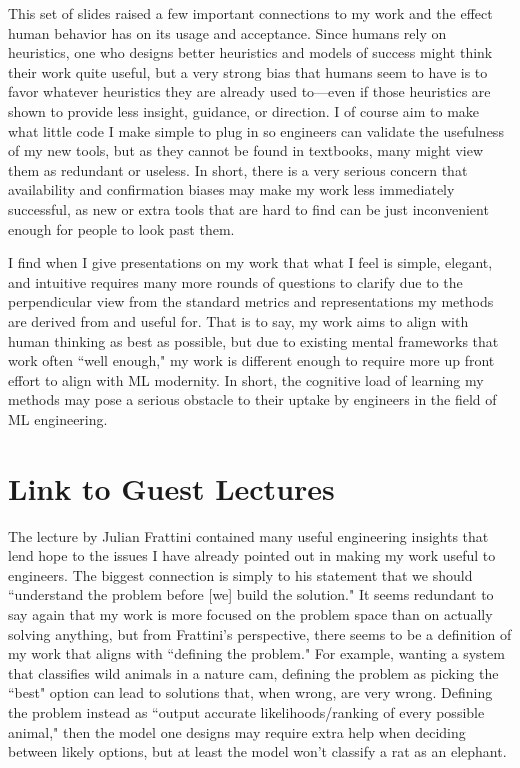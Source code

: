 \documentclass{article}
\begin{document}
This set of slides raised a few important connections to my work and the effect human behavior has on its usage and acceptance. 
Since humans rely on heuristics, one who designs better heuristics and models of success might think their work quite useful, but a very strong bias that humans seem to have is to favor whatever heuristics they are already used to—even if those heuristics are shown to provide less insight, guidance, or direction. 
I of course aim to make what little code I make simple to plug in so engineers can validate the usefulness of my new tools, but as they cannot be found in textbooks, many might view them as redundant or useless.
In short, there is a very serious concern that availability and confirmation biases may make my work less immediately successful, as new or extra tools that are hard to find can be just inconvenient enough for people to look past them. 

I find when I give presentations on my work that what I feel is simple, elegant, and intuitive requires many more rounds of questions to clarify due to the perpendicular view from the standard metrics and representations my methods are derived from and useful for. 
That is to say, my work aims to align with human thinking as best as possible, but due to existing mental frameworks that work often ``well enough," my work is different enough to require more up front effort to align with ML modernity. 
In short, the cognitive load of learning my methods may pose a serious obstacle to their uptake by engineers in the field of ML engineering.


\section{Link to Guest Lectures}

The lecture by Julian Frattini contained many useful engineering insights that lend hope to the issues I have already pointed out in making my work useful to engineers. 
The biggest connection is simply to his statement that we should ``understand the problem before [we] build the solution."
It seems redundant to say again that my work is more focused on the problem space than on actually solving anything, but from Frattini's perspective, there seems to be a definition of my work that aligns with ``defining the problem." 
For example, wanting a system that classifies wild animals in a nature cam, defining the problem as picking the ``best" option can lead to solutions that, when wrong, are very wrong. 
Defining the problem instead as ``output accurate likelihoods/ranking of every possible animal," then the model one designs may require extra help when deciding between likely options, but at least the model won't classify a rat as an elephant.
\end{document}
